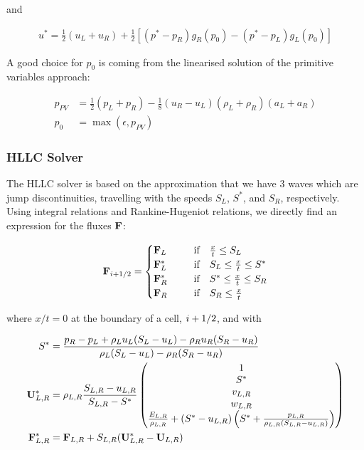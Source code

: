 and

\begin{align}
	u^*  = \frac{1}{2} (u_L + u_R) + \frac{1}{2} \left[ (p^* - p_R) g_R(p_0) - (p^* - p_L) g_L(p_0) \right]
\end{align}


A good choice for $p_0$ is coming from the linearised solution of the primitive variables approach:

\begin{align*}
	p_{PV} &= \frac{1}{2} (p_L + p_R) - \frac{1}{8} (u_R - u_L)(\rho_L + \rho_R)(a_L + a_R)\\
	p_0 &= \max(\epsilon, p_{PV})
\end{align*}










\subsubsection{HLLC Solver}


The HLLC solver is based on the approximation that we have 3 waves which are jump discontinuities, travelling with the speeds $S_L$, $S^*$, and $S_R$, respectively.
Using integral relations and Rankine-Hugeniot relations, we directly find an expression for the fluxes $\mathbf{F}$:


\begin{align}
	\mathbf{F}_{i+1/2} = \begin{cases}
		\mathbf{F}_L ~~~~ &\text{ if }		~~	\frac{x}{t} \leq S_L \\
		\mathbf{F}^*_L ~~~~ &\text{ if }	~~  S_L \leq \frac{x}{t} \leq S^* \\
		\mathbf{F}^*_R ~~~~ &\text{ if }	~~	S^* \leq \frac{x}{t} \leq S_R \\
		\mathbf{F}_R ~~~~ &\text{ if }		~~	S_R \leq \frac{x}{t} \\
	\end{cases}
\end{align}

where $x/t = 0$ at the boundary of a cell, $i+1/2$, and with

\begin{align}
	S^* &=
		\frac{p_R - p_L  + \rho_L u_L (S_L - u_L) - \rho_R u_R (S_R - u_R)}
			{\rho_L (S_L - u_L) - \rho_R (S_R - u_R) } \label{eq:hllc-sstar}\\
	\mathbf{U}^*_{L,R} &=
		\rho_{L,R} \frac{ S_{L,R} - u_{L,R}}{S_{L,R} - S^*} 
		\begin{pmatrix}
			1\\
			S^*\\
			v_{L,R}\\
			w_{L,R}\\
			\frac{E_{L,R}}{\rho_{L,R}} + (S^* - u_{L,R}) \left( S^* + \frac{p_{L,R}}{\rho_{L,R}(S_{L,R} - u_{L,R})} \right)
		\end{pmatrix} \\
	\mathbf{F}^*_{L,R} &=
		\mathbf{F}_{L, R} + S_{L,R} ( \mathbf{U}^*_{L,R} - \mathbf{U}_{L,R} )
\end{align}

